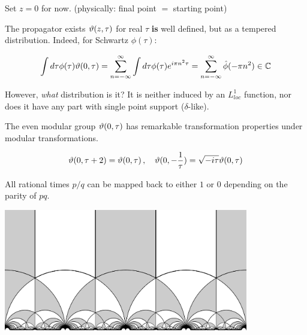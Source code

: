 \documentclass{beamer}
\begin{document}
\begin{frame}
    \begin{center}\Large Set $z=0$ for now.
    \vfill
    (physically: final point $=$ starting point)
\end{center}
\end{frame}

\begin{frame}{The propagator exists}
    $\vartheta(z,\tau)$ for real $\tau$ \textbf{is} well defined, but as a tempered distribution. Indeed, for Schwartz $\phi(\tau)$:

    \begin{equation}
        \int d\tau \phi(\tau) \vartheta(0,\tau) = \sum_{n=-\infty}^\infty \int d\tau \phi(\tau) e^{i\pi n^2 \tau} = \sum_{n=-\infty}^\infty \hat\phi(-\pi n^2) \in \mathbb{C}
        \label{}
    \end{equation}

    \vfill

    However, \emph{what} distribution is it? It is neither induced by an $L^1_{loc}$ function, nor does it have any part with single point support ($\delta$-like).
\end{frame}

\begin{frame}{The even modular group}
    $\vartheta(0,\tau)$ has remarkable transformation properties under modular transformations.

\begin{equation}
    \vartheta(0,\tau + 2) = \vartheta(0,\tau)\,,\quad \vartheta(0,-\frac{1}{\tau}) = \sqrt{-i\tau} \vartheta(0,\tau)
    \label{}
\end{equation}

All rational times $p/q$ can be mapped back to either $1$ or $0$ depending on the parity of $pq$.

\begin{center}\includegraphics[width=0.8\textwidth]{modulargroup}\end{center}

\end{frame}
\end{document}

